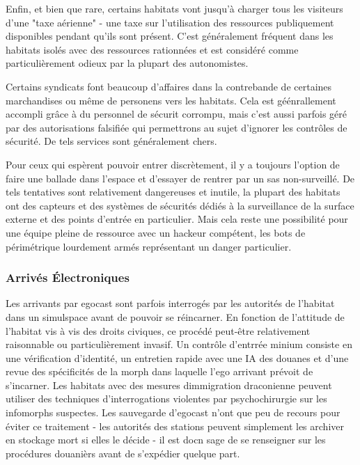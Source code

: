 Enfin, et bien que rare, certains habitats vont jusqu'à charger tous les visiteurs d'une "taxe aérienne" - une taxe sur l'utilisation des ressources publiquement disponibles pendant qu'ils sont présent. C'est généralement fréquent dans les habitats isolés avec des ressources rationnées et est considéré comme particulièrement odieux par la plupart des autonomistes. 

Certains syndicats font beaucoup d'affaires dans la contrebande de certaines marchandises ou même de personens vers les habitats. Cela est géénrallement accompli grâce à du personnel de sécurit corrompu, mais c'est aussi parfois géré par des autorisations falsifiée qui permettrons au sujet d'ignorer les contrôles de sécurité. De tels services sont généralement chers. 

Pour ceux qui espèrent pouvoir entrer discrètement, il y a toujours l'option de faire une ballade dans l'espace et d'essayer de rentrer par un sas non-surveillé. De tels tentatives sont relativement dangereuses et inutile, la plupart des habitats ont des capteurs et des systèmes de sécurités dédiés à la surveillance de la surface externe et des points d'entrée en particulier. Mais cela reste une possibilité pour une équipe pleine de ressource avec un hackeur compétent, les bots de périmétrique lourdement armés représentant un danger particulier. 

\subsubsection{Arrivés Électroniques} 

Les arrivants par egocast sont parfois interrogés par les autorités de l'habitat dans un simulspace avant de pouvoir se réincarner. En fonction de l'attitude de l'habitat vis à vis des droits civiques, ce procédé peut-être relativement raisonnable ou particulièrement invasif. Un contrôle d'entrrée minium consiste en une vérification d'identité, un entretien rapide avec une IA des douanes et d'une revue des spécificités de la morph dans laquelle l'ego arrivant prévoit de s'incarner. Les habitats avec des mesures dimmigration draconienne peuvent utiliser des techniques d'interrogations violentes par psychochirurgie sur les infomorphs suspectes. Les sauvegarde d'egocast n'ont que peu de recours pour éviter ce traitement - les autorités des stations peuvent simplement les archiver en stockage mort si elles le décide - il est docn sage de se renseigner sur les procédures douanièrs avant de s'expédier quelque part. 

